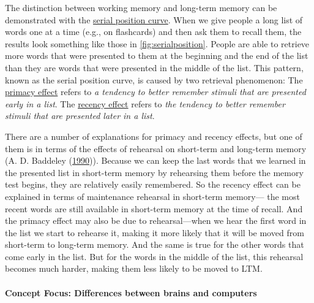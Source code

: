 \documentclass[
]{krantz}
\begin{document}
The distinction between working memory and long-term memory can be demonstrated with the \protect\hyperlink{serial-position-curve}{serial position curve}. When we give people a long list of words one at a time (e.g., on flashcards) and then ask them to recall them, the results look something like those in \ref{fig:serialposition}. People are able to retrieve more words that were presented to them at the beginning and the end of the list than they are words that were presented in the middle of the list. This pattern, known as the serial position curve, is caused by two retrieval phenomenon: The \protect\hyperlink{primacy-effect}{primacy effect} refers to \emph{a tendency to better remember stimuli that are presented early in a list}. The \protect\hyperlink{recency-effect}{recency effect} refers to \emph{the tendency to better remember stimuli that are presented later in a list}.

There are a number of explanations for primacy and recency effects, but one of them is in terms of the effects of rehearsal on short-term and long-term memory (A. D. Baddeley (\protect\hyperlink{ref-Baddeley1990}{1990})). Because we can keep the last words that we learned in the presented list in short-term memory by rehearsing them before the memory test begins, they are relatively easily remembered. So the recency effect can be explained in terms of maintenance rehearsal in short-term memory--- the most recent words are still available in short-term memory at the time of recall. And the primacy effect may also be due to rehearsal---when we hear the first word in the list we start to rehearse it, making it more likely that it will be moved from short-term to long-term memory. And the same is true for the other words that come early in the list. But for the words in the middle of the list, this rehearsal becomes much harder, making them less likely to be moved to LTM.

\hypertarget{concept-focus-differences-between-brains-and-computers}{%
\paragraph*{Concept Focus: Differences between brains and computers}\label{concept-focus-differences-between-brains-and-computers}}
\end{document}
